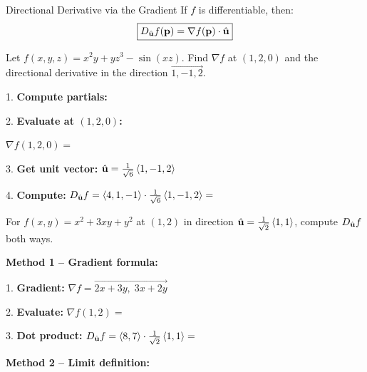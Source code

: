 \documentclass[11pt]{article}
\begin{document}
\begin{thmbox}{Directional Derivative via the Gradient}
If $f$ is differentiable, then:
\[\boxed{D_{\hat{\mathbf{u}}} f(\mathbf{p}) = \nabla f(\mathbf{p}) \cdot \hat{\mathbf{u}}}\]
\end{thmbox}

\begin{example}
Let $f(x,y,z) = x^2 y + yz^3 - \sin(xz)$. Find $\nabla f$ at $(1, 2, 0)$ and the directional derivative in the direction $\vec{1, -1, 2}$.

1. \textbf{Compute partials:}


2. \textbf{Evaluate at $(1,2,0)$:}

$\nabla f(1,2,0) = $ 

3. \textbf{Get unit vector:} $\hat{\mathbf{u}} = \frac{1}{\sqrt{6}}\left\langle 1,-1,2 \right\rangle$

4. \textbf{Compute:} $D_{\hat{\mathbf{u}}}f = \left\langle 4,1,-1 \right\rangle\cdot\frac{1}{\sqrt{6}}\left\langle 1,-1,2 \right\rangle = $ 
\end{example}

\begin{example}
For $f(x,y) = x^2 + 3xy + y^2$ at $(1,2)$ in direction $\hat{\mathbf{u}} = \frac{1}{\sqrt{2}}\left\langle 1,1 \right\rangle$, compute $D_{\hat{\mathbf{u}}}f$ both ways.

\textbf{Method 1 -- Gradient formula:}

1. \textbf{Gradient:} $\nabla f = \vec{2x+3y,\; 3x+2y}$

2. \textbf{Evaluate:} $\nabla f(1,2) = $ 

3. \textbf{Dot product:} $D_{\hat{\mathbf{u}}}f = \left\langle 8,7 \right\rangle\cdot\frac{1}{\sqrt{2}}\left\langle 1,1 \right\rangle = $ 

\medskip
\textbf{Method 2 -- Limit definition:}

\end{example}
\end{document}
